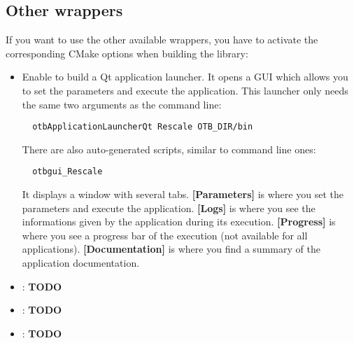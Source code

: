 \subsection{Other wrappers}\label{sec:wrappedAppliOtherWrap}
If you want to use the other available wrappers, you have to activate the corresponding CMake 
options when building the library:
\begin{itemize}
  \item Enable  to build a Qt application launcher. It opens a GUI which 
  allows you to set the parameters and execute the application. This launcher only needs 
  the same two arguments as the command line:
  \begin{lstlisting}
  otbApplicationLauncherQt Rescale OTB_DIR/bin
  \end{lstlisting}
  There are also auto-generated scripts, similar to command line ones:
  \begin{lstlisting}
  otbgui_Rescale
  \end{lstlisting}
  It displays a window with several tabs. \textbf{[Parameters]} is where you set the parameters and execute the application.
  \textbf{[Logs]} is where you see the informations given by the application during its execution. \textbf{[Progress]} is 
  where you see a progress bar of the execution (not available for all applications). \textbf{[Documentation]} is where you
  find a summary of the application documentation.
   
  \item {} : \textbf{TODO}
  \item {} : \textbf{TODO}
  \item {} : \textbf{TODO}
\end{itemize}

